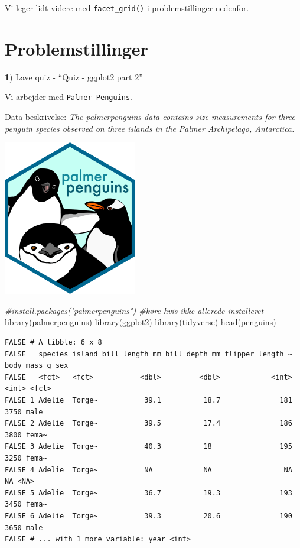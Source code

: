 \documentclass[
]{book}
\newenvironment{Shaded}{\begin{snugshade}}{\end{snugshade}}
\newcommand{\CommentTok}[1]{\textcolor[rgb]{0.56,0.35,0.01}{\textit{#1}}}
\newcommand{\FunctionTok}[1]{\textcolor[rgb]{0.00,0.00,0.00}{#1}}
\newcommand{\NormalTok}[1]{#1}
\begin{document}
Vi leger lidt videre med \texttt{facet\_grid()} i problemstillinger nedenfor.

\hypertarget{problemstillinger-3}{%
\section{Problemstillinger}\label{problemstillinger-3}}

\textbf{1}) Lave quiz - ``Quiz - ggplot2 part 2''

Vi arbejder med \texttt{Palmer\ Penguins}.

Data beskrivelse: \emph{The palmerpenguins data contains size measurements for three penguin species observed on three islands in the Palmer Archipelago, Antarctica.}

\includegraphics[width=0.2\linewidth]{plots/palmerpenguins}

\begin{Shaded}
\begin{Highlighting}[]
\CommentTok{\#install.packages("palmerpenguins") \#køre hvis ikke allerede installeret}
\FunctionTok{library}\NormalTok{(palmerpenguins)}
\FunctionTok{library}\NormalTok{(ggplot2)}
\FunctionTok{library}\NormalTok{(tidyverse)}
\FunctionTok{head}\NormalTok{(penguins)}
\end{Highlighting}
\end{Shaded}

\begin{verbatim}
FALSE # A tibble: 6 x 8
FALSE   species island bill_length_mm bill_depth_mm flipper_length_~ body_mass_g sex  
FALSE   <fct>   <fct>           <dbl>         <dbl>            <int>       <int> <fct>
FALSE 1 Adelie  Torge~           39.1          18.7              181        3750 male 
FALSE 2 Adelie  Torge~           39.5          17.4              186        3800 fema~
FALSE 3 Adelie  Torge~           40.3          18                195        3250 fema~
FALSE 4 Adelie  Torge~           NA            NA                 NA          NA <NA> 
FALSE 5 Adelie  Torge~           36.7          19.3              193        3450 fema~
FALSE 6 Adelie  Torge~           39.3          20.6              190        3650 male 
FALSE # ... with 1 more variable: year <int>
\end{verbatim}
\end{document}
